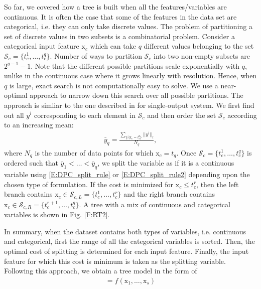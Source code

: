 So far, we covered how a tree is built when all the features/variables are continuous. It is often the case that some of the features in the data set are categorical, i.e. they can only take discrete values. 
The problem of partitioning a set of discrete values in two subsets is a combinatorial problem. Consider a categorical input feature $\mathrm{x}_c$ which can take $q$ different values belonging to the set $\mathcal{S}_c=\{t_c^1,\dots,t_c^q \}$. Number of ways to partition $\mathcal{S}_c$ into two non-empty subsets are $2^{q-1}-1$. Note that the different possible partitions scale exponentially with $q$, unlike in the continuous case where it grows linearly with resolution. Hence, when $q$ is large, exact search is not computationally easy to solve. We use a near-optimal approach to narrow down this search over all possible partitions. The approach is simliar to the one described in \cite{Ripley2007} for single-output system. We first find out all $y^i$ corresponding to each element in $\mathcal{S}_c$ and then order the set $\mathcal{S}_c$ according to an increasing mean:
\begin{gather}
\label{E:DPC_cat_split_rule}
\bar{y}_q = \frac{\displaystyle\sum_{\{i|\mathrm{x}_c=t_c^q\}} ||y^i||_l}{N_q},
\end{gather}
where $N_q$ is the number of data points for which $\mathrm{x}_c=t_q$. Once $\mathcal{S}_c=\{t_c^1,\dots,t_c^q \}$ is ordered such that 
$\bar{y}_1< \dots < \bar{y}_q$, we split the variable as if it is a continuous variable using \eqref{E:DPC_split_rule} or \eqref{E:DPC_split_rule2} depending upon the chosen type of formulation. If the cost is minimized for $\mathrm{x}_c \leq t_c^r$, then the left branch contains $\mathrm{x}_c \in \mathcal{S}_{c,L} = \{ t_c^1,\dots,t_c^r \}$ and the right branch contains $\mathrm{x}_c \in \mathcal{S}_{c,R} = \{ t_c^{r+1},\dots,t_c^q \}$. A tree with a mix of continuous and categorical variables is shown in Fig. \ref{F:RT2}. 

In summary, when the dataset contains both types of variables, i.e. continuous and categorical, first the range of all the categorical variables is sorted. 
Then, the optimal cost of splitting is determined for each input feature. 
Finally, the input feature for which this cost is minimum is taken as the splitting variable. Following this approach, we obtain a tree model in the form of
\textcolor[rgb]{1.00,0.00,0.00}{\begin{gather}
[\mathrm{y}_1, \dots, \mathrm{y}_N] = f \left( \mathrm{x}_1, \dots, \mathrm{x}_s \right)
 \label{eq:regtree_multi}
\end{gather}}

